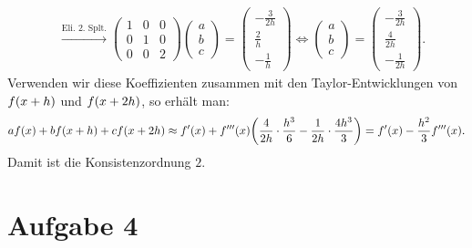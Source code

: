 \documentclass{exercise}
\begin{document}
\begin{align*}
        &\xrightarrow{\text{Eli. 2. Splt.}} \begin{pmatrix}
            1 & 0 & 0\\
            0 & 1 & 0\\
            0 & 0 & 2
        \end{pmatrix}\begin{pmatrix}
            a\\
            b\\
            c
        \end{pmatrix} = \begin{pmatrix}
            -\frac{3}{2h}\\
            \frac{2}{h}\\
            -\frac{1}{h}
        \end{pmatrix} \iff \begin{pmatrix}
            a\\
            b\\
            c
        \end{pmatrix} = \begin{pmatrix}
            -\frac{3}{2h}\\
            \frac{4}{2h}\\
            -\frac{1}{2h}
        \end{pmatrix}.
    \end{align*}
    Verwenden wir diese Koeffizienten zusammen mit den Taylor-Entwicklungen von \(f\parentheses*{x + h}\) und \(f\parentheses*{x + 2h}\), so erhält man:
    \[
        af\parentheses*{x} + bf\parentheses*{x + h} + cf\parentheses*{x + 2h} \approx f'\parentheses*{x} + f'''\parentheses*{x}\parentheses*{\frac{4}{2h} \cdot \frac{h^3}{6} - \frac{1}{2h} \cdot \frac{4h^3}{3}} = f'\parentheses*{x} - \frac{h^2}{3}f'''\parentheses*{x}.
    \]
    Damit ist die Konsistenzordnung \(2\).


    \section*{Aufgabe 4}
    
\end{document}
